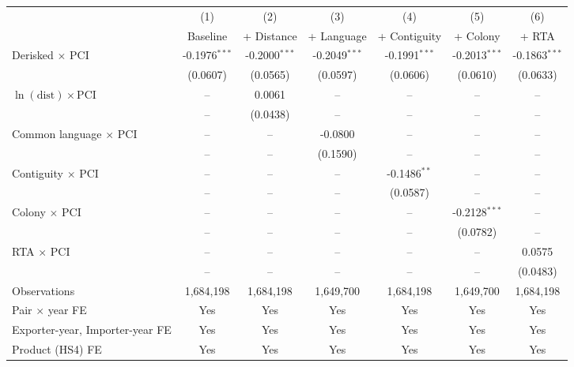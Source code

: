 \begin{tabular}{lcccccc}
\toprule
 & (1) & (2) & (3) & (4) & (5) & (6) \\
 & Baseline & + Distance & + Language & + Contiguity & + Colony & + RTA \\
\midrule
Derisked $\times$ PCI & -0.1976$^{***}$ & -0.2000$^{***}$ & -0.2049$^{***}$ & -0.1991$^{***}$ & -0.2013$^{***}$ & -0.1863$^{***}$ \\
 & (0.0607) & (0.0565) & (0.0597) & (0.0606) & (0.0610) & (0.0633) \\
\midrule
$\ln(\text{dist}) \times \text{PCI}$ & -- & 0.0061 & -- & -- & -- & -- \\
 & -- & (0.0438) & -- & -- & -- & -- \\
Common language $\times$ PCI & -- & -- & -0.0800 & -- & -- & -- \\
 & -- & -- & (0.1590) & -- & -- & -- \\
Contiguity $\times$ PCI & -- & -- & -- & -0.1486$^{**}$ & -- & -- \\
 & -- & -- & -- & (0.0587) & -- & -- \\
Colony $\times$ PCI & -- & -- & -- & -- & -0.2128$^{***}$ & -- \\
 & -- & -- & -- & -- & (0.0782) & -- \\
RTA $\times$ PCI & -- & -- & -- & -- & -- & 0.0575 \\
 & -- & -- & -- & -- & -- & (0.0483) \\
\midrule
Observations & 1,684,198 & 1,684,198 & 1,649,700 & 1,684,198 & 1,649,700 & 1,684,198 \\
Pair $\times$ year FE & Yes & Yes & Yes & Yes & Yes & Yes \\
Exporter-year, Importer-year FE & Yes & Yes & Yes & Yes & Yes & Yes \\
Product (HS4) FE & Yes & Yes & Yes & Yes & Yes & Yes \\
\bottomrule
\end{tabular}